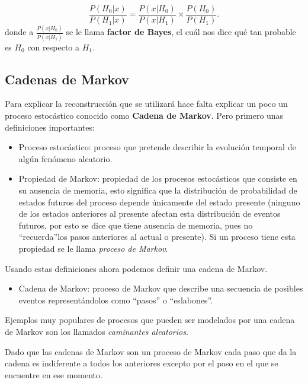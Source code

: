 \documentclass{article}
\begin{document}
\begin{equation}
\frac{P(H_0\vert x)}{P(H_1\vert x)}=\frac{P(x\vert H_0)}{P(x\vert H_1)}\times \frac{P(H_0)}{P(H_1)}.
\end{equation}
donde a $\frac{P(x\vert H_0)}{P(x\vert H_1)}$ se le llama \textbf{factor de Bayes}, el cu\'al nos dice qu\'e tan probable es $H_0$ con respecto a $H_1$.


\subsection*{Cadenas de Markov}

Para explicar la reconstrucci\'on que se utilizar\'a hace falta explicar un poco un proceso estoc\'astico conocido como \textbf{Cadena de Markov}. Pero primero unas definiciones importantes:

\begin{itemize}
\item Proceso estoc\'astico: proceso que pretende describir la evoluci\'on temporal de alg\'un fen\'omeno aleatorio.
\item Propiedad de Markov: propiedad de los procesos estoc\'asticos que consiste en su ausencia de memoria, esto significa que la distribuci\'on de probabilidad de estados futuros del proceso depende \'unicamente del estado presente (ninguno de los estados anteriores al presente afectan esta distribuci\'on de eventos futuros, por esto se dice que tiene ausencia de memoria, pues no ``recuerda''los pasos anteriores al actual o presente). Si un proceso tiene esta propiedad se le llama \textit{proceso de Markov}.

\end{itemize} 

Usando estas definiciones ahora podemos definir una cadena de Markov.

\begin{itemize}
\item Cadena de Markov: proceso de Markov que describe una secuencia de posibles eventos represent\'andolos como ``pasos'' o ``eslabones''.
\end{itemize}
Ejemplos muy populares de procesos que pueden ser modelados por una cadena de Markov son los llamados \textit{caminantes aleatorios}.

Dado que las cadenas de Markov son un proceso de Markov cada paso que da la cadena es indiferente a todos los anteriores excepto por el paso en el que se encuentre en ese momento.
\end{document}
